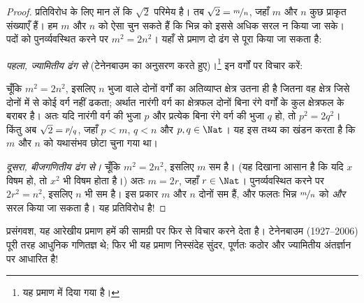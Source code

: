 \documentclass[../../../include/open-logic-section]{subfiles}
\begin{document}
\begin{proof}
प्रतिविरोध के लिए मान लें कि $\sqrt{2}$ परिमेय है। तब $\sqrt{2} =
\nicefrac{m}{n}$, जहाँ $m$ और $n$ कुछ प्राकृत संख्याएँ हैं। हम $m$ और $n$
को ऐसा चुन सकते हैं कि भिन्न को इससे अधिक
सरल न किया जा सके। पदों को पुनर्व्यवस्थित करने पर $m^{2} = 2n^{2}$। यहाँ से
प्रमाण दो ढंग से पूरा किया जा सकता है:

\emph{पहला, ज्यामितीय ढंग से} (टेनेनबाउम का अनुसरण करते हुए)।\footnote{यह
प्रमाण \cite{Conway2006} में दिया गया है।} इन वर्गों पर विचार करें:
\begin{center}	
\end{center}
चूँकि $m^2 = 2n^2$, इसलिए $n$ भुजा वाले दोनों वर्गों का अतिव्याप्त क्षेत्र
उतना ही है जितना वह क्षेत्र जिसे दोनों में से कोई वर्ग नहीं ढकता; अर्थात
नारंगी वर्ग का क्षेत्रफल दोनों बिना रंगे वर्गों के कुल क्षेत्रफल के बराबर है।
अतः यदि नारंगी वर्ग की भुजा $p$ और प्रत्येक बिना रंगे वर्ग की भुजा $q$ हो, तो
$p^2 = 2q^2$। किंतु अब $\sqrt{2} = \nicefrac{p}{q}$, जहाँ $p < m$, $q < n$
और $p, q \in
\Nat$। यह इस तथ्य का खंडन करता है कि $m$ और $n$ को यथासंभव छोटा चुना गया था।
		
\emph{दूसरा, बीजगणितीय ढंग से।} चूँकि $m^{2} = 2n^{2}$, इसलिए $m$ सम है।
(यह दिखाना आसान है कि यदि $x$ विषम हो, तो $x^2$ भी विषम होता है।) अतः
$m = 2r$, जहाँ $r \in \Nat$। पुनर्व्यवस्थित करने पर $2r^2 = n^2$,
इसलिए $n$ भी सम है। इस प्रकार $m$ और $n$ दोनों सम हैं, और फलतः भिन्न
$\nicefrac{m}{n}$ को \emph{और} सरल किया जा सकता है। यह प्रतिविरोध है!
\end{proof}

प्रसंगवश, यह आरेखीय प्रमाण हमें  की सामग्री
पर फिर से विचार करने देता है। टेनेनबाउम (1927--2006) पूरी तरह आधुनिक गणितज्ञ
थे; फिर भी यह प्रमाण निस्संदेह सुंदर, पूर्णतः कठोर और ज्यामितीय अंतर्ज्ञान पर
आधारित है!
\end{document}
